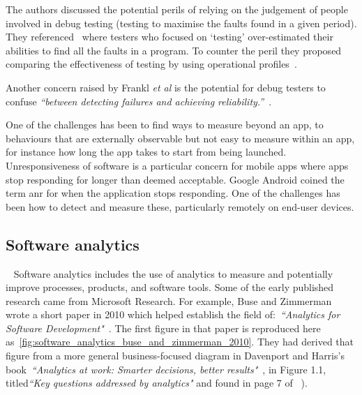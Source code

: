 The authors discussed the potential perils of relying on the judgement of people involved in debug testing (testing to maximise the faults found in a given period). They referenced~ where testers who focused on `testing' over-estimated their abilities to find all the faults in a program. To counter the peril they proposed comparing the effectiveness of testing by using operational profiles~.

Another concern raised by Frankl \emph{et al} is the potential for debug testers to confuse \emph{``between detecting failures and achieving reliability.''}~. 


One of the challenges has been to find ways to measure beyond an app, to behaviours that are externally observable but not easy to measure within an app, for instance how long the app takes to start from being launched. Unresponsiveness of software is a particular concern for mobile apps where apps stop responding for longer than deemed acceptable. Google Android coined the term \Gls{anr} for when the application stops responding. One of the challenges has been how to detect and measure these, particularly remotely on end-user devices. 


\subsection{Software analytics}~\label{rw-software-analytics-topic}
Software analytics includes the use of analytics to measure and potentially improve processes, products, and software tools. Some of the early published research came from Microsoft Research. For example, Buse and Zimmerman wrote a short paper in 2010 which helped establish the field of:~\emph{``Analytics for Software Development"}~. The first figure in that paper is reproduced here as~\ref{fig:software_analytics_buse_and_zimmerman_2010}. They had derived that figure from a more general business-focused diagram in Davenport and Harris's book~\emph{``Analytics at work: Smarter decisions, better results"}~\cite{davenport2010analytics_at_work},  in Figure 1.1, titled\emph{``Key questions addressed by analytics"} and found in page 7 of ~). 

